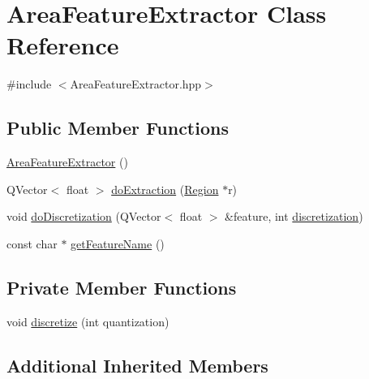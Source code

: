 \hypertarget{class_area_feature_extractor}{\section{Area\+Feature\+Extractor Class Reference}
\label{class_area_feature_extractor}
}


{\ttfamily \#include $<$Area\+Feature\+Extractor.\+hpp$>$}

\subsection*{Public Member Functions}
\begin{DoxyCompactItemize}
\item 
\hyperlink{class_area_feature_extractor_ab183d05cccc841a75b368ce55d2f37bb}{Area\+Feature\+Extractor} ()
\item 
Q\+Vector$<$ float $>$ \hyperlink{class_area_feature_extractor_a9dfd50444d94b1fd82fdd6ec0f9163c3}{do\+Extraction} (\hyperlink{class_region}{Region} $\ast$r)
\item 
void \hyperlink{class_area_feature_extractor_a9969af2ec658c4404651cc13bef00089}{do\+Discretization} (Q\+Vector$<$ float $>$ \&feature, int \hyperlink{class_feature_extractor_a1d800b4e5f3af7c758bfc5f157110681}{discretization})
\item 
const char $\ast$ \hyperlink{class_area_feature_extractor_af4d987a1253cadd506280d3c8b99d860}{get\+Feature\+Name} ()
\end{DoxyCompactItemize}
\subsection*{Private Member Functions}
\begin{DoxyCompactItemize}
\item 
void \hyperlink{class_area_feature_extractor_a01c1c501f11f6b986e46b7b1fe2d4508}{discretize} (int quantization)
\end{DoxyCompactItemize}
\subsection*{Additional Inherited Members}


